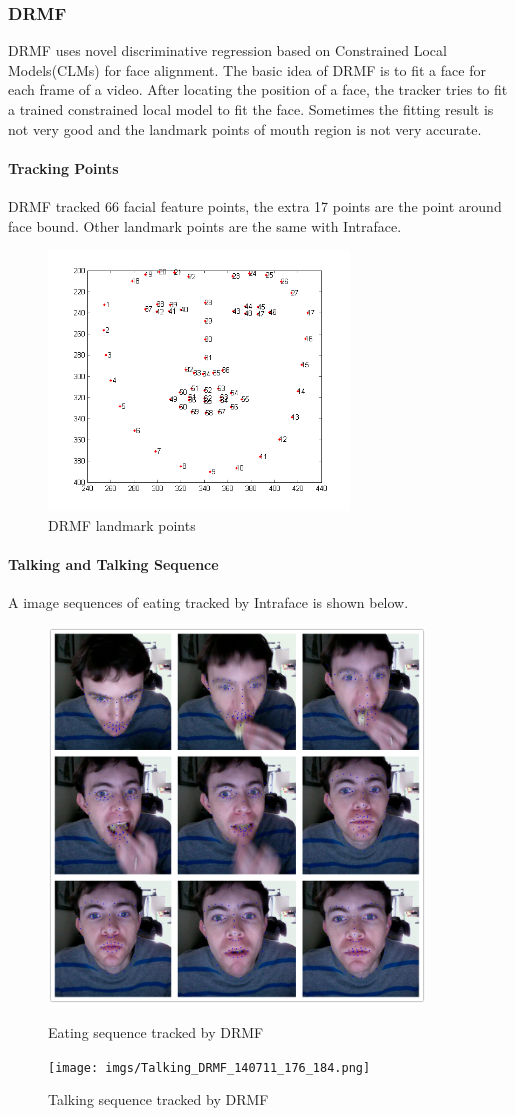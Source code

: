 \subsubsection{DRMF}
DRMF uses novel discriminative regression based on Constrained Local Models(CLMs) for face alignment. The basic idea of DRMF is to fit a face for each frame of a video. After locating the position of a face, the tracker tries to fit a trained constrained local model to fit the face. Sometimes the fitting result is not very good and the landmark points of mouth region is not very accurate.
\paragraph{Tracking Points}
DRMF tracked 66 facial feature points, the extra 17 points are the point around face bound. Other landmark points are the same with Intraface.
\begin{figure}[ht]
\centering
\includegraphics[width = 80mm]{imgs/FacialIndexDRMF.png}
\caption{DRMF landmark points}
\label{fig:DPI}
\end{figure}
\paragraph{Talking and Talking Sequence}
A image sequences of eating tracked by Intraface is shown below.
\begin{figure}[p]
\centering
\includegraphics[width=100mm]{imgs/Tracking_DRMF_eating.png}
\caption{Eating sequence tracked by DRMF}
\label{fig:DES}
\texttt{[image: imgs/Talking\_DRMF\_140711\_176\_184.png]}
\caption{Talking sequence tracked by DRMF}
\label{fig:DTS}
\end{figure}
\newpage
